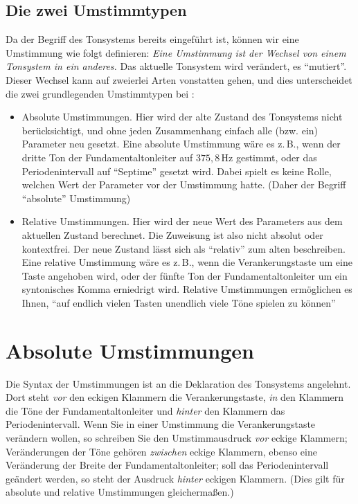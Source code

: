 \subsection{Die zwei Umstimmtypen}\label{sec:die-zwei-umst}
Da der Begriff des Tonsystems bereits eingeführt ist, können wir
eine Umstimmung wie folgt definieren:
\emph{Eine Umstimmung ist der Wechsel von einem Tonsystem in ein
anderes.} Das aktuelle Tonsystem wird verändert, es "`mutiert"'.
Dieser Wechsel kann auf zweierlei Arten vonstatten gehen, und dies
unterscheidet die zwei grundlegenden Umstimmtypen bei \mutabor{}:

\begin{itemize}
\item {}Absolute Umstimmungen.  Hier wird der
  alte Zustand des Tonsystems nicht berücksichtigt, und ohne jeden
  Zusammenhang einfach alle (bzw. ein) Parameter neu gesetzt. Eine
  absolute Umstimmung wäre es z.\,B., wenn der dritte Ton der Fundamentaltonleiter auf
  $375{,}8\,\mathrm{Hz}$ gestimmt, oder das Periodenintervall auf
  "`Septime"' gesetzt wird. Dabei spielt es keine Rolle, welchen Wert
  der Parameter vor der Umstimmung hatte. (Daher der Begriff
  "`absolute"' Umstimmung)
\item {}Relative Umstimmungen.  Hier wird der
  neue Wert des Parameters aus dem aktuellen Zustand berechnet. Die
  Zuweisung ist also nicht absolut oder kontextfrei. Der neue Zustand
  lässt sich als "`relativ"' zum alten beschreiben. Eine relative
  Umstimmung wäre es z.\,B., wenn die Verankerungstaste um eine Taste
  angehoben wird, oder der fünfte Ton der Fundamentaltonleiter um ein syntonisches Komma
  erniedrigt wird.  Relative Umstimmungen er\-mög\-lichen es Ihnen,
  "`auf endlich vielen Tasten unendlich viele Töne spielen zu können"'
\end{itemize}

\section{Absolute Umstimmungen}\label{sec:absol-umst}
Die Syntax der Umstimmungen ist an die Deklaration des Tonsystems
angelehnt. Dort steht \emph{vor} den eckigen Klammern die
Verankerungstaste, \emph{in } den Klammern die Töne der Fundamentaltonleiter und {\em
hinter} den Klammern das Periodenintervall. Wenn Sie in einer
Umstimmung die Verankerungstaste verändern wollen, so schreiben Sie
den Umstimmausdruck \emph{vor} eckige Klammern; Veränderungen der Töne
gehören \emph{zwischen} eckige Klammern, ebenso eine Veränderung der
Breite der Fundamentaltonleiter; soll das Periodenintervall geändert werden, so steht der
Ausdruck \emph{hinter} eckigen Klammern. (Dies gilt für absolute und
relative Umstimmungen gleichermaßen.)

